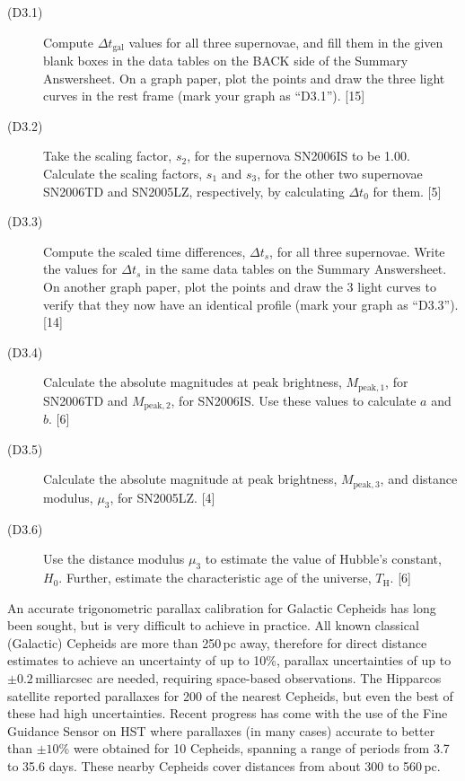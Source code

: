 \begin{description}
\item[(D3.1)] Compute $\Delta t_{\mathrm{gal}}$ values for all three
  supernovae, and fill them in the given blank boxes in the data tables on the
  BACK side of the Summary Answersheet. On a graph paper, plot the points and
  draw the three light curves in the rest frame (mark your graph as ``D3.1'').
  \hfill[15]
\item[(D3.2)] Take the scaling factor, $s_2$, for the supernova SN2006IS to be
  1.00. Calculate the scaling factors, $s_1$ and $s_3$, for the other two
  supernovae SN2006TD and SN2005LZ, respectively, by calculating $\Delta t_0$
  for them. \hfill[5]
\item[(D3.3)] Compute the scaled time differences, $\Delta t_s$, for all three
  supernovae. Write the values for $\Delta t_s$ in the same data tables on the
  Summary Answersheet. On another graph paper, plot the points and draw the 3
  light curves to verify that they now have an identical profile (mark your
  graph as ``D3.3''). \hfill[14]
\item[(D3.4)] Calculate the absolute magnitudes at peak brightness,
  $M_{\mathrm{peak},1}$, for SN2006TD and $M_{\mathrm{peak},2}$, for SN2006IS.
  Use these values to calculate $a$ and $b$. \hfill[6]
\item[(D3.5)] Calculate the absolute magnitude at peak brightness,
  $M_{\mathrm{peak},3}$, and distance modulus, $\mu_3$, for SN2005LZ.
  \hfill[4]
\item[(D3.6)] Use the distance modulus $\mu_3$ to estimate the value of
  Hubble's constant, $H_0$. Further, estimate the characteristic age of the
  universe, $T_{\mathrm{H}}$. \hfill[6]
\end{description}

An accurate trigonometric parallax calibration for Galactic Cepheids has long
been sought, but is very difficult to achieve in practice. All known classical
(Galactic) Cepheids are more than 250\,pc away, therefore for direct distance
estimates to achieve an uncertainty of up to 10\%, parallax uncertainties of
up to $\pm 0.2$\,milliarcsec are needed, requiring space-based observations.
The Hipparcos satellite reported parallaxes for 200 of the nearest Cepheids,
but even the best of these had high uncertainties. Recent progress has come
with the use of the Fine Guidance Sensor on HST where parallaxes (in many
cases) accurate to better than $\pm 10$\% were obtained for 10 Cepheids,
spanning a range of periods from 3.7 to 35.6 days. These nearby Cepheids cover
distances from about 300 to 560\,pc.

